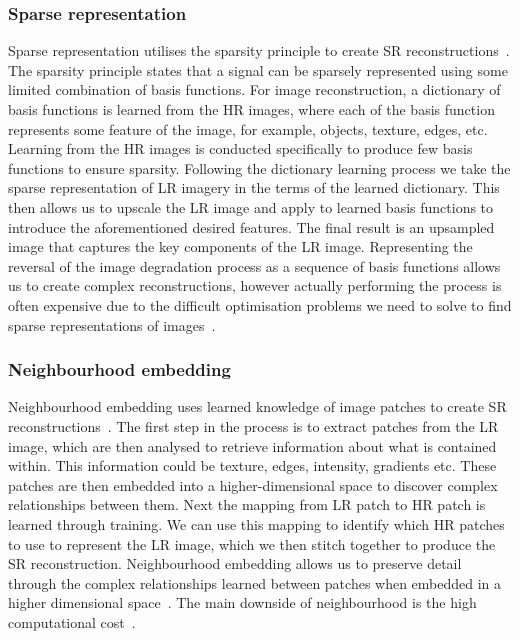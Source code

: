 \subsubsection{Sparse representation}
Sparse representation utilises the sparsity principle to create SR reconstructions~\cite{ref}. The sparsity principle states that a signal can be sparsely represented using some limited combination of basis functions. For image reconstruction, a dictionary of basis functions is learned from the HR images, where each of the basis function represents some feature of the image, for example, objects, texture, edges, etc. Learning from the HR images is conducted specifically to produce few basis functions to ensure sparsity. Following the dictionary learning process we take the sparse representation of LR imagery in the terms of the learned dictionary. This then allows us to upscale the LR image and apply to learned basis functions to introduce the aforementioned desired features. The final result is an upsampled image that captures the key components of the LR image. Representing the reversal of the image degradation process as a sequence of basis functions allows us to create complex reconstructions, however actually performing the process is often expensive due to the difficult optimisation problems we need to solve to find sparse representations of images~\cite{ref}.

\subsubsection{Neighbourhood embedding}
Neighbourhood embedding uses learned knowledge of image patches to create SR reconstructions~\cite{ref}. The first step in the process is to extract patches from the LR image, which are then analysed to retrieve information about what is contained within. This information could be texture, edges, intensity, gradients etc. These patches are then embedded into a higher-dimensional space to discover complex relationships between them. Next the mapping from LR patch to HR patch is learned through training. We can use this mapping to identify which HR patches to use to represent the LR image, which we then stitch together to produce the SR reconstruction. Neighbourhood embedding allows us to preserve detail through the complex relationships learned between patches when embedded in a higher dimensional space~\cite{ref}. The main downside of neighbourhood is the high computational cost~\cite{ref}.

